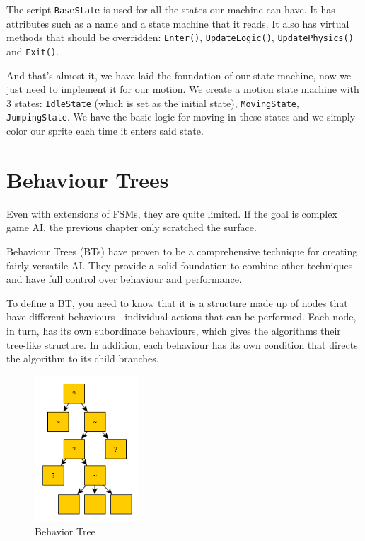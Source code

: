 \documentclass[a4paper,12pt,openright]{book}
\begin{document}
The script \texttt{BaseState} is used for all the states our machine can have. It has attributes such as a name and a state machine that it reads. It also has virtual methods that should be overridden: \texttt{Enter()}, \texttt{UpdateLogic()}, \texttt{UpdatePhysics()} and \texttt{Exit()}.

And that's almost it, we have laid the foundation of our state machine, now we just need to implement it for our motion. We create a motion state machine with 3 states: \texttt{IdleState} (which is set as the initial state), \texttt{MovingState}, \texttt{JumpingState}. We have the basic logic for moving in these states and we simply color our sprite each time it enters said state.

\clearpage

\section{Behaviour Trees}

Even with extensions of FSMs, they are quite limited. If the goal is complex game AI, the previous chapter only scratched the surface.

Behaviour Trees (BTs) \cite{BehaviourTreeStarterPack} have proven to be a comprehensive technique for creating fairly versatile AI. They provide a solid foundation to combine other techniques and have full control over behaviour and performance.

To define a BT, you need to know that it is a structure made up of nodes that have different behaviours - individual actions that can be performed. Each node, in turn, has its own subordinate behaviours, which gives the algorithms their tree-like structure. In addition, each behaviour has its own condition that directs the algorithm to its child branches.

\begin{figure}[h]
\begin{center}
    \includegraphics[width=0.35\textwidth]{Images/behaviour_tree.png}
\end{center}
\caption{Behavior Tree \cite{behaviourTreeBlog}}
\label{pic3}
\end{figure}
\end{document}
